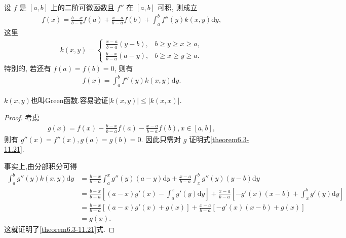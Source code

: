 \documentclass[../../main.tex]{subfiles}
\begin{document}
\begin{theorem}[带积分型余项的Lagrange插值公式]\label{theorem:带积分型余项的Lagrange插值公式}
设 $f$ 是 $[a,b]$ 上的二阶可微函数且 $f''$ 在 $[a,b]$ 可积, 则成立
\begin{align*}
f(x) = \frac{b-x}{b-a} f(a) + \frac{x-a}{b-a} f(b) + \int_{a}^{b} f''(y) k(x,y) \mathrm{d}y,
\end{align*}
这里
\begin{align*}
k(x,y) = 
\begin{cases}
\frac{x-a}{b-a} (y-b), & b \geq y \geq x \geq a, \\
\frac{b-x}{b-a} (a-y), & b \geq x \geq y \geq a.
\end{cases}
\end{align*}
特别的, 若还有 $f(a) = f(b) = 0$, 则有
\begin{align}
f(x) = \int_{a}^{b} f''(y) k(x,y) \mathrm{d}y.\label{theorem6.3-11.21}
\end{align}
\end{theorem}
\begin{note}
$k(x,y)$也叫Green函数.容易验证$|k(x,y)|\leq |k(x,x)|$.
\end{note}
\begin{proof}
考虑
\begin{align*}
g(x) = f(x) - \frac{b-x}{b-a} f(a) - \frac{x-a}{b-a} f(b), x \in [a,b],
\end{align*}
则有 $g''(x) = f''(x), g(a) = g(b) = 0$. 因此只需对 $g$ 证明式\eqref{theorem6.3-11.21}.

事实上,由分部积分可得
\begin{align*}
\int_{a}^{b} g''(y) k(x,y) \mathrm{d}y &= \frac{b-x}{b-a} \int_{a}^{x} g''(y) (a-y) \mathrm{d}y + \frac{x-a}{b-a} \int_{x}^{b} g''(y) (y-b) \mathrm{d}y \\
&= \frac{b-x}{b-a} \left[ (a-x) g'(x) - \int_{a}^{x} g'(y) \mathrm{d}y \right] + \frac{x-a}{b-a} \left[ -g'(x) (x-b) + \int_{x}^{b} g'(y) \mathrm{d}y \right] \\
&= \frac{b-x}{b-a} [(a-x) g'(x) + g(x)] + \frac{x-a}{b-a} [-g'(x) (x-b) + g(x)] \\
&= g(x).
\end{align*}
这就证明了\eqref{theorem6.3-11.21}式.
\end{proof}
\end{document}
